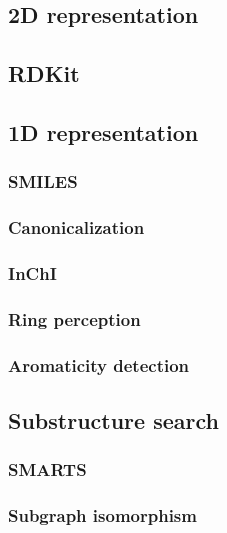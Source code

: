 
\subsection{2D representation}

\subsection{RDKit}

\subsection{1D representation}

\subsubsection{SMILES}

\subsubsection{Canonicalization}

\subsubsection{InChI}

\subsubsection{Ring perception}

\subsubsection{Aromaticity detection}

\subsection{Substructure search}

\subsubsection{SMARTS}

\subsubsection{Subgraph isomorphism}

